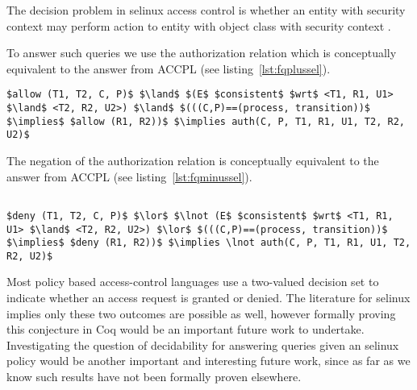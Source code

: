 
The decision problem in \ac{selinux} access control is whether an entity with security context  may perform action  to entity with object class  with security context .

To answer such queries we use the authorization relation  which is conceptually equivalent to the  answer from \ac{ACCPL} (see listing~\ref{lst:fqplussel}).

\lstset{mathescape, language=AST} 
\begin{lstlisting}[frame=single, caption={\syn{Permitted} for \ac{selinux}},label={lst:fqplussel}]
$allow (T1, T2, C, P)$ $\land$ $(E$ $consistent$ $wrt$ <T1, R1, U1> $\land$ <T2, R2, U2>) $\land$ $(((C,P)==(process, transition))$ $\implies$ $allow (R1, R2))$ $\implies auth(C, P, T1, R1, U1, T2, R2, U2)$ 
\end{lstlisting}

The negation of the authorization relation  is conceptually equivalent to the  answer from \ac{ACCPL} (see listing~\ref{lst:fqminussel}).

\lstset{mathescape, language=AST} 
\begin{lstlisting}[frame=single, caption={\syn{NotPermitted} for \ac{selinux}},label={lst:fqminussel}]

$deny (T1, T2, C, P)$ $\lor$ $\lnot (E$ $consistent$ $wrt$ <T1, R1, U1> $\land$ <T2, R2, U2>) $\lor$ $(((C,P)==(process, transition))$ $\implies$ $deny (R1, R2))$ $\implies \lnot auth(C, P, T1, R1, U1, T2, R2, U2)$ 

\end{lstlisting}


Most policy based access-control languages use a two-valued decision set to indicate whether an access request is granted or denied. The literature for \ac{selinux} implies only these two outcomes are possible as well, however formally proving this conjecture in Coq would be an important future work to undertake. Investigating the question of decidability for answering queries given an \ac{selinux} policy would be another important and interesting future work, since as far as we know such results have not been formally proven elsewhere. 
































